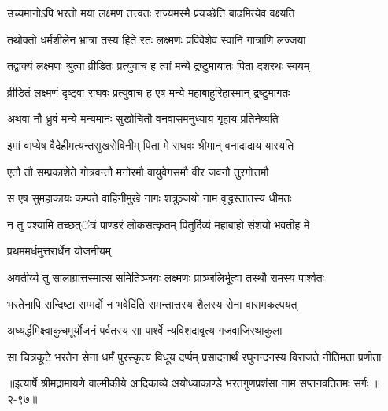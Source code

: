 \twolineshloka
{उच्यमानोऽपि भरतो मया लक्ष्मण तत्त्वतः}
{राज्यमस्मै प्रयच्छेति बाढमित्येव वक्ष्यति} %

\twolineshloka
{तथोक्तो धर्मशीलेन भ्रात्रा तस्य हिते रतः}
{लक्ष्मणः प्रविवेशेव स्वानि गात्राणि लज्जया} %

\twolineshloka
{तद्वाक्यं लक्ष्मणः श्रुत्वा व्रीडितः प्रत्युवाच ह}
{त्वां मन्ये द्रष्टुमायातः पिता दशरथः स्वयम्} %

\twolineshloka
{व्रीडितं लक्ष्मणं दृष्ट्वा राघवः प्रत्युवाच ह}
{एष मन्ये महाबाहुरिहास्मान् द्रष्टुमागतः} %

\twolineshloka
{अथवा नौ ध्रुवं मन्ये मन्यमानः सुखोचितौ}
{वनवासमनुध्याय गृहाय प्रतिनेष्यति} %

\twolineshloka
{इमां वाप्येष वैदेहीमत्यन्तसुखसेविनीम्}
{पिता मे राघवः श्रीमान् वनादादाय यास्यति} %

\twolineshloka
{एतौ तौ सम्प्रकाशेते गोत्रवन्तौ मनोरमौ}
{वायुवेगसमौ वीर जवनौ तुरगोत्तमौ} %

\twolineshloka
{स एष सुमहाकायः कम्पते वाहिनीमुखे}
{नागः शत्रुञ्जयो नाम वृद्धस्तातस्य धीमतः} %

\twolineshloka
{न तु पश्यामि तच्छत्ऺत्रं पाण्डरं लोकसत्कृतम्}
{पितुर्दिव्यं महाबाहो संशयो भवतीह मे} %

\onelineshloka
{प्रथममर्धमुत्तरार्धेन योजनीयम्} %

\twolineshloka
{अवतीर्य्य तु सालाग्रात्तस्मात्स समितिञ्जयः}
{लक्ष्मणः प्राञ्जलिर्भूत्वा तस्थौ रामस्य पार्श्वतः} %

\twolineshloka
{भरतेनापि सन्दिष्टा सम्मर्दो न भवेदिऺति}
{समन्तात्तस्य शैलस्य सेना वासमकल्पयत्} %

\twolineshloka
{अध्यर्द्धमिक्ष्वाकुचमूर्योजनं पर्वतस्य सा}
{पार्श्वे न्यविशदावृत्य गजवाजिरथाकुला} %

\twolineshloka
{सा चित्रकूटे भरतेन सेना धर्मं पुरस्कृत्य विधूय दर्प्पम्}
{प्रसादनार्थं रघुनन्दनस्य विराजते नीतिमता प्रणीता} %


॥इत्यार्षे श्रीमद्रामायणे वाल्मीकीये आदिकाव्ये अयोध्याकाण्डे भरतगुणप्रशंसा नाम सप्तनवतितमः सर्गः ॥२-९७॥
